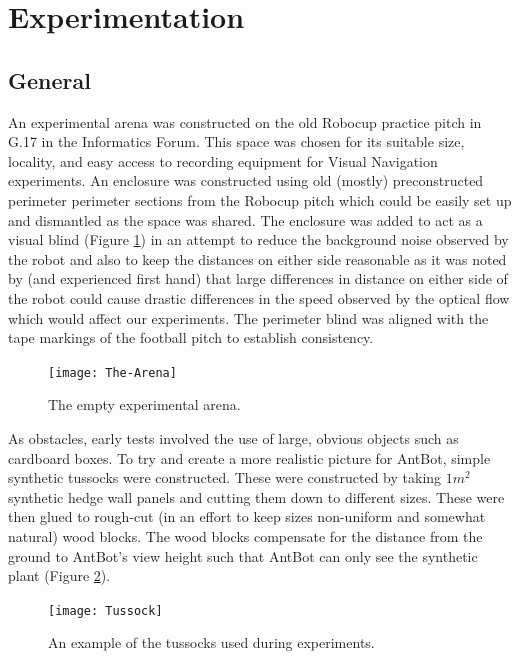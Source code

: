 \documentclass[a4paper,11pt,twoside,openright]{article}
\let\oldsection\section
\def\section{\cleardoublepage\oldsection}
\begin{document}
\section{Experimentation}\label{sec:test}
\subsection{General}
An experimental arena was constructed on the old Robocup practice pitch in G.17 in the Informatics Forum. This space was chosen
for its suitable size, locality, and easy access to recording equipment for Visual Navigation experiments. An enclosure was constructed
using old (mostly) preconstructed perimeter perimeter sections from the Robocup pitch which could be easily set up and dismantled as the
space was shared. The enclosure was added to act as a visual blind (Figure \ref{fig:arena}) in an attempt to reduce the background noise observed by the robot and
also to keep the distances on either side reasonable as it was noted by \cite{Scimeca2017} (and experienced first hand) that large differences
in distance on either side of the robot could cause drastic differences in the speed observed by the optical flow which would affect our
experiments. The perimeter blind was aligned with the tape markings of the football pitch to establish consistency.
\newline


\begin{figure}
  \centering
  \texttt{[image: The-Arena]}
  \caption{
    \label{fig:arena} The empty experimental arena.
  }
\end{figure}

As obstacles, early tests involved the use of large, obvious objects such as cardboard boxes. To try and create a more realistic
picture for AntBot, simple synthetic tussocks were constructed. These were constructed by taking $1m^2$ synthetic hedge wall panels and
cutting them down to different sizes. These were then glued to rough-cut (in an effort to keep sizes non-uniform and somewhat
natural) wood blocks. The wood blocks compensate for the distance from the ground to AntBot's view height such that AntBot can only
see the synthetic plant (Figure \ref{fig:tussock}).
\newline

\begin{figure}[h]
  \centering
  \texttt{[image: Tussock]}
  \caption{
    \label{fig:tussock} An example of the tussocks used during experiments.
  }
\end{figure}
\end{document}
